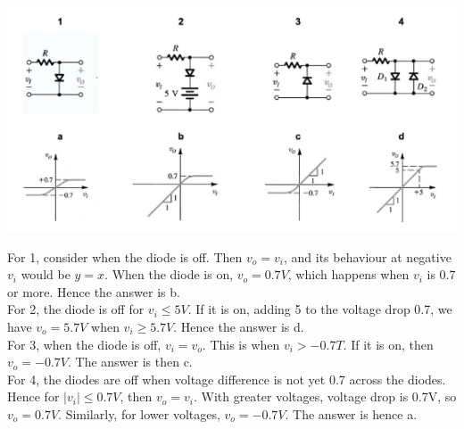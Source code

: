 \documentclass[answers]{exam}
\begin{document}
\begin{questions}
\includegraphics{q2.png}

\begin{solution}
    For 1, consider when the diode is off. Then $v_o = v_i$, and its behaviour at negative $v_i$ would be $y=x$. When the diode is on, $v_o = 0.7\unit{V}$, which happens when $v_i$ is 0.7 or more. Hence the answer is b. \\
    For 2, the diode is off for $v_i \leq 5\unit{V}$. If it is on, adding 5 to the voltage drop 0.7, we have $v_o = 5.7\unit{V}$ when $v_i \geq 5.7\unit{V}$. Hence the answer is d. \\
    For 3, when the diode is off, $v_i = v_o$. This is when $v_i > -0.7\unit{T}$. If it is on, then $v_o = -0.7\unit{V}$. The answer is then c. \\
    For 4, the diodes are off when voltage difference is not yet 0.7 across the diodes. Hence for $|v_i| \leq 0.7\unit{V}$, then $v_o = v_i$. With greater voltages, voltage drop is 0.7V, so $v_o = 0.7\unit{V}$. Similarly, for lower voltages, $v_o = -0.7\unit{V}$. The answer is hence a.
\end{solution}
\end{questions}
\end{document}
